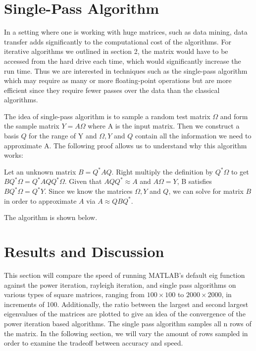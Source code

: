 \documentclass[11pt]{amsart}
\begin{document}
\section{Single-Pass Algorithm}
In a setting where one is working with huge matrices, such as data mining, data transfer adds significantly to the computational cost of the algorithms. For iterative algorithms we outlined in section 2, the matrix would have to be accessed from the hard drive each time, which would significantly increase the run time. Thus we are interested in techniques such as the single-pass algorithm which may require as many or more floating-point operations but are more efficient since they require fewer passes over the data than the classical algorithms. 

The idea of single-pass algorithm is to sample a random test matrix $\Omega$ and form the sample matrix $Y = A\Omega$ where A is the input matrix. Then we construct a basis $Q$ for the range of Y and $\Omega, Y$ and $Q$ contain all the information we need to approximate A. The following proof allows us to understand why this algorithm works:

Let an unknown matrix $B = Q^{\ast}AQ$. Right multiply the definition by $Q^{\ast}\Omega$ to get $BQ^{\ast}\Omega = Q^{\ast}AQQ^{\ast}\Omega$. Given that $AQQ^{\ast} \approx A$ and $A\Omega = Y$, B satisfies $BQ^{\ast}\Omega = Q^{\ast}Y$. Since we know the matrices $\Omega, Y$ and $Q$, we can solve for matrix $B$ in order to approximate $A$ via $A \approx QBQ^{\ast}$. 

The algorithm is shown below.

\begin{center}
\end{center}

\section{Results and Discussion}

This section will compare the speed of running MATLAB's default eig function against the power iteration, rayleigh iteration, and single pass algorithms on various types of square matrices, ranging from $100 \times 100$ to $ 2000 \times 2000$, in increments of 100. Additionally, the ratio between the largest and second largest eigenvalues of the matrices are plotted to give an idea of the convergence of the power iteration based algorithms. The single pass algorithm samples all n rows of the matrix. In the following section, we will vary the amount of rows sampled in order to examine the tradeoff between accuracy and speed. 
\end{document}
